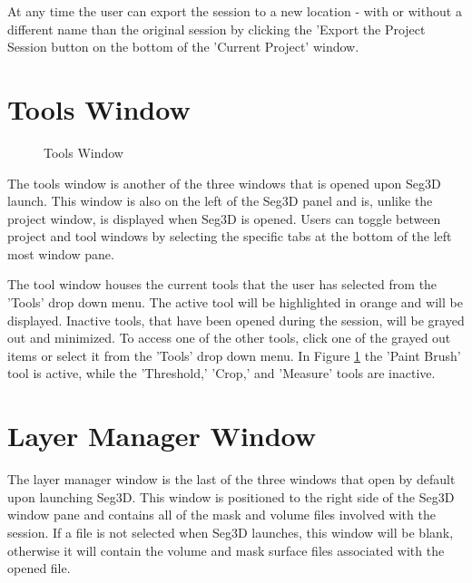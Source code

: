 \documentclass[fleqn,11pt,openany]{book}
\begin{document}
At any time the user can export the session to a new location - with or without a different name than the original session by clicking the 'Export the Project Session button on the bottom of the  'Current Project' window.

\section{Tools Window}
\begin{figure}[b]
\caption{Tools Window}\label{fig:ToolWindow}
\end{figure}
The tools window is another of the three windows that is opened upon Seg3D launch.  
This window is also on the left of the Seg3D panel and is, unlike the project window, is displayed when Seg3D is opened.  
Users can toggle between project and tool windows by selecting the specific tabs at the bottom of the left most window pane.

The tool window houses the current tools that the user has selected from the 'Tools' drop down menu.  
The active tool will be highlighted in orange and will be displayed.  
Inactive tools, that have been opened during the session, will be grayed out and minimized.  
To access one of the other tools, click one of the grayed out items or select it from the 'Tools' drop down menu.  
In Figure \ref{fig:ToolWindow} the 'Paint Brush' tool is active, while the 'Threshold,' 'Crop,' and 'Measure' tools are inactive.



\section{Layer Manager Window}
The layer manager window is the last of the three windows that open by default upon launching Seg3D.  
This window is positioned to the right side of the Seg3D window pane and contains all of the mask and volume files involved with the session.  
If a file is not selected when Seg3D launches, this window will be blank, otherwise it will contain the volume and mask surface files associated with the opened file.
\end{document}
